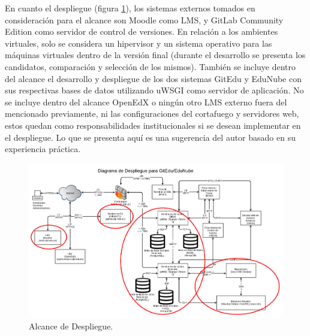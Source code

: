 En cuanto el despliegue (figura \ref{alc_desp_ge_en}), los sistemas externos tomados en consideración para el alcance son Moodle como LMS, y GitLab Community Edition como servidor de control de versiones. En relación a los ambientes virtuales, solo se considera un hipervisor y un sistema operativo para las máquinas virtuales dentro de la versión final (durante el desarrollo se presenta los candidatos, comparación y selección de los mismos). También se incluye dentro del alcance el desarrollo y despliegue de los dos sistemas GitEdu y EduNube con sus respectivas bases de datos utilizando uWSGI como servidor de aplicación. No se incluye dentro del alcance OpenEdX o ningún otro LMS  externo fuera del mencionado previamente, ni las configuraciones del cortafuego y servidores web, estos quedan como responsabilidades institucionales si se desean implementar en el despliegue. Lo que se presenta aquí es una sugerencia del autor basado en su experiencia práctica.

\begin{landscape}

	\begin{figure}
	  \begin{center}
	    \includegraphics[width=1.4\textwidth]{Figures/alc_desp_ge_en.png}
	  \end{center}
	  \caption{Alcance de Despliegue.}
	  \label{alc_desp_ge_en}
	\end{figure}

\end{landscape}
